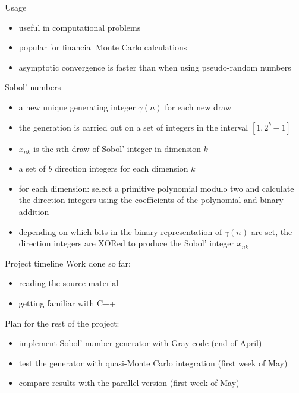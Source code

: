 \documentclass[11pt]{beamer}
\begin{document}
\begin{frame}{Usage}
    \begin{itemize}[--]
        \item useful in computational problems
        \medskip
        \item popular for financial Monte Carlo calculations 
        \medskip
        \item asymptotic convergence is faster than when using pseudo-random numbers
    \end{itemize}
\end{frame}

\begin{frame}{Sobol' numbers}
    \begin{itemize}[--]
        \item a new unique generating integer $\gamma(n)$ for each new draw 
        \item the generation is carried out on a set of integers in the interval $[1, 2^b-1]$
        \item $x_{nk}$ is the $n$th draw of Sobol' integer in dimension $k$
        \item a set of $b$ \alert{direction integers} for each dimension $k$
        \item for each dimension: select a primitive polynomial modulo two and calculate the direction integers using the coefficients of the polynomial and binary addition
        \item depending on which bits in the binary representation of $\gamma(n)$ are set, the direction integers are XORed to produce the Sobol' integer $x_{nk}$
    \end{itemize}
\end{frame}

\begin{frame}{Project timeline}
    Work done so far:
    \begin{itemize}[--]
        \item reading the source material
        \item getting familiar with C++
    \end{itemize}
    
    \bigskip
    
    Plan for the rest of the project: 
    \begin{itemize}[--]
        \item implement Sobol' number generator with Gray code (end of April)
        \item test the generator with quasi-Monte Carlo integration (first week of May)
        \item compare results with the parallel version (first week of May)
    \end{itemize}
\end{frame}
\end{document}
